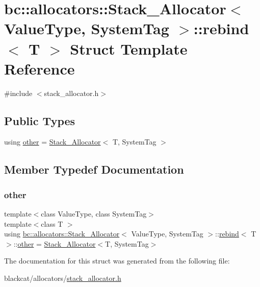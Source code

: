 \hypertarget{structbc_1_1allocators_1_1Stack__Allocator_1_1rebind}{}\section{bc\+:\+:allocators\+:\+:Stack\+\_\+\+Allocator$<$ Value\+Type, System\+Tag $>$\+:\+:rebind$<$ T $>$ Struct Template Reference}
\label{structbc_1_1allocators_1_1Stack__Allocator_1_1rebind}


{\ttfamily \#include $<$stack\+\_\+allocator.\+h$>$}

\subsection*{Public Types}
\begin{DoxyCompactItemize}
\item 
using \hyperlink{structbc_1_1allocators_1_1Stack__Allocator_1_1rebind_a7971ca9f885f7281e5bf9fcdec458f6b}{other} = \hyperlink{classbc_1_1allocators_1_1Stack__Allocator}{Stack\+\_\+\+Allocator}$<$ T, System\+Tag $>$
\end{DoxyCompactItemize}


\subsection{Member Typedef Documentation}
\mbox{\label{structbc_1_1allocators_1_1Stack__Allocator_1_1rebind_a7971ca9f885f7281e5bf9fcdec458f6b}} 
\subsubsection{\texorpdfstring{other}{other}}
{\footnotesize\ttfamily template$<$class Value\+Type, class System\+Tag$>$ \\
template$<$class T $>$ \\
using \hyperlink{classbc_1_1allocators_1_1Stack__Allocator}{bc\+::allocators\+::\+Stack\+\_\+\+Allocator}$<$ Value\+Type, System\+Tag $>$\+::\hyperlink{structbc_1_1allocators_1_1Stack__Allocator_1_1rebind}{rebind}$<$ T $>$\+::\hyperlink{structbc_1_1allocators_1_1Stack__Allocator_1_1rebind_a7971ca9f885f7281e5bf9fcdec458f6b}{other} =  \hyperlink{classbc_1_1allocators_1_1Stack__Allocator}{Stack\+\_\+\+Allocator}$<$T, System\+Tag$>$}



The documentation for this struct was generated from the following file\+:\begin{DoxyCompactItemize}
\item 
blackcat/allocators/\hyperlink{stack__allocator_8h}{stack\+\_\+allocator.\+h}\end{DoxyCompactItemize}
